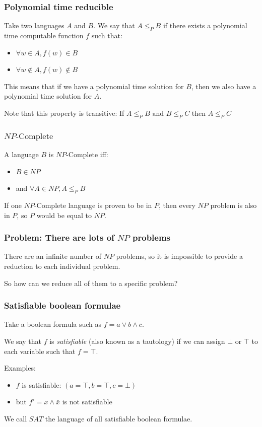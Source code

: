 \documentclass[aspectratio=169]{beamer}
\begin{document}
\begin{frame}
\frametitle{Polynomial time reducible}

Take two languages $A$ and $B$. We say that $A \leq_P B$ if there exists a polynomial time computable function $f$ such that:

\begin{itemize}
    \item $\forall w \in A, f(w) \in B$
    \item $\forall w \notin A, f(w) \notin B$
\end{itemize}

This means that if we have a polynomial time solution for $B$, then we also have a polynomial time solution for $A$.

Note that this property is transitive: If $A \leq_P B \text{ and } B \leq_P C \text{ then } A \leq_P C$

\end{frame}

\begin{frame}
\frametitle{$NP\text{-Complete}$}

A language $B$ is $NP\text{-Complete}$ iff:

\begin{itemize}
    \item $B \in NP$
    \item and $\forall A \in NP, A \leq_P B$
\end{itemize}

If one $NP\text{-Complete}$ language is proven to be in $P$, then every $NP$ problem is also in $P$, so $P$ would be equal to $NP$.
\end{frame}

\begin{frame}
\frametitle{Problem: There are lots of $NP$ problems}
There are an infinite number of $NP$ problems, so it is impossible to provide a reduction to each individual problem.

So how can we reduce all of them to a specific problem?
\end{frame}

\begin{frame}
\frametitle{Satisfiable boolean formulae}
Take a boolean formula such as $f = a \vee b \wedge \bar{c}$.

We say that $f$ is {\em satisfiable} (also known as a tautology) if we can assign $\bot$ or $\top$ to each variable such that $f = \top$.

Examples:
\begin{itemize}
    \item $f$ is satisfiable: $(a = \top, b = \top, c =  \bot)$
    \item but $f' = x \wedge \bar{x}$ is not satisfiable
\end{itemize}

We call $SAT$ the language of all satisfiable boolean formulae.
\end{frame}
\end{document}
